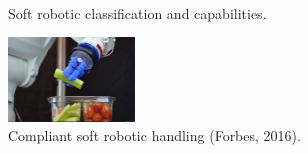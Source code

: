 \begin{figure}
\centering
{}
~
\caption{Soft robotic classification and capabilities.\cite{Trivedi2008}}
\label{fig:Soft robotic classification and capabilities}
\end{figure}

\begin{figure}
\centering
\includegraphics[width=0.3\textwidth]{images/literature/SoftRobotCelery} 
\caption{Compliant soft robotic handling (Forbes, 2016).}
\label{fig:Compliant soft robotic handling}
\end{figure}




